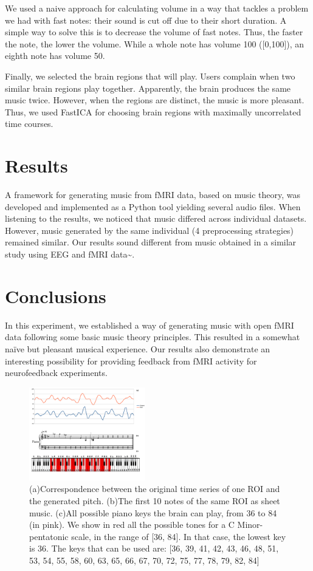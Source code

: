 \documentclass[twocolumn]{bmcart}%
\begin{document}
We used a naive approach for calculating volume in a way that tackles a
problem we had with fast notes: their sound is cut off due to their
short duration. A simple way to solve this is to decrease the volume of
fast notes. Thus, the faster the note, the lower the volume. While a
whole note has volume 100 ({[}0,100{]}), an eighth note has volume 50.

Finally, we selected the brain regions that will play. Users complain
when two similar brain regions play together. Apparently, the brain
produces the same music twice. However, when the regions are distinct,
the music is more pleasant. Thus, we used FastICA \cite{scikitlearn} for
choosing brain regions with maximally uncorrelated time courses.

\section{Results}\label{results}

A framework for generating music from fMRI data, based on music theory,
was developed and implemented as a Python tool yielding several audio
files. When listening to the results, we noticed that music differed
across individual datasets. However, music generated by the same
individual (4 preprocessing strategies) remained similar. Our results
sound different from music obtained in a similar study using EEG and
fMRI data\textasciitilde{}\cite{lu2012scale}.

\section{Conclusions}\label{conclusions}

In this experiment, we established a way of generating music with open
fMRI data following some basic music theory principles. This resulted in
a somewhat naïve but pleasant musical experience. Our results also
demonstrate an interesting possibility for providing feedback from fMRI
activity for neurofeedback experiments.

\begin{figure}
  \includegraphics[width=0.45\textwidth]{figure}
  \caption{\label{keyfig}
  (a)Correspondence between the original time series of one ROI and the generated pitch.
  (b)The first 10 notes of the same ROI as sheet music.
  (c)All possible piano keys the brain can play, from 36 to 84 (in pink).
    We show in red all the possible tones for a C Minor-pentatonic scale, in the range of [36, 84].
    In that case, the lowest key is 36.
    The keys that can be used are: [36, 39, 41, 42, 43, 46, 48, 51, 53, 54, 55, 58, 60, 63, 65, 66, 67, 70, 72, 75, 77, 78, 79, 82, 84]
      }
\end{figure}
\end{document}
